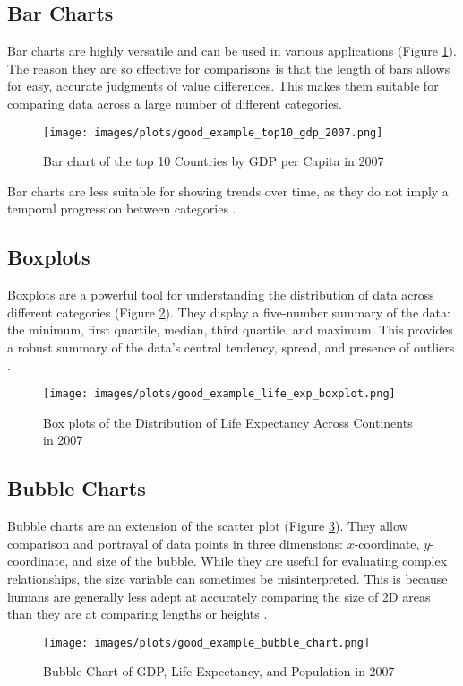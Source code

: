 \subsection{Bar Charts}

Bar charts are highly versatile and can be used in various applications (Figure \ref{fig:bar_chart_good}). The reason they are so effective for comparisons is that the length of bars allows for easy, accurate judgments of value differences. This makes them suitable for comparing data across a large number of different categories.

\begin{figure}[h]
    \centering
    \texttt{[image: images/plots/good\_example\_top10\_gdp\_2007.png]} 
    \caption{Bar chart of the top 10 Countries by GDP per Capita in 2007}
    \label{fig:bar_chart_good}
\end{figure}

Bar charts are less suitable for showing trends over time, as they do not imply a temporal progression between categories \cite{heerTourVisualizationZoo2010}.

\subsection{Boxplots}

Boxplots are a powerful tool for understanding the distribution of data across different categories (Figure \ref{fig:boxplot_good}). They display a five-number summary of the data: the minimum, first quartile, median, third quartile, and maximum. This provides a robust summary of the data's central tendency, spread, and presence of outliers \cite{tukeyExploratoryDataAnalysis1977}.

\begin{figure}[h]
    \centering
    \texttt{[image: images/plots/good\_example\_life\_exp\_boxplot.png]} 
    \caption{Box plots of the Distribution of Life Expectancy Across Continents in 2007}
    \label{fig:boxplot_good}
\end{figure}

\subsection{Bubble Charts}

Bubble charts are an extension of the scatter plot (Figure \ref{fig:bubble_chart_good}). They allow comparison and portrayal of data points in three dimensions: $x$-coordinate, $y$-coordinate, and size of the bubble. While they are useful for evaluating complex relationships, the size variable can sometimes be misinterpreted. This is because humans are generally less adept at accurately comparing the size of 2D areas than they are at comparing lengths or heights \cite{clevelandGraphicalPerceptionTheory1984}.

\begin{figure}[h]
    \centering
    \texttt{[image: images/plots/good\_example\_bubble\_chart.png]} 
    \caption{Bubble Chart of GDP, Life Expectancy, and Population in 2007}
    \label{fig:bubble_chart_good}
\end{figure}